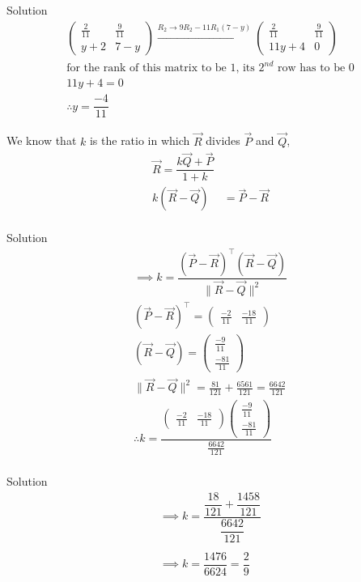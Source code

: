 \documentclass{beamer}
\providecommand{\brak}[1]{\ensuremath{\left(#1\right)}}
\theoremstyle{remark}
\providecommand{\norm}[1]{\lVert#1\rVert}
\newcommand{\myvec}[1]{\ensuremath{\begin{pmatrix}#1\end{pmatrix}}}
\begin{document}
\begin{frame}{Solution}
\begin{align*}
 \myvec{\frac{2}{11}&\frac{9}{11}\\ y+2&7-y} \overset{R_2 \rightarrow 9R_2-11 R_1\brak{7-y}}{\longrightarrow} \myvec{\frac{2}{11} &\frac{9}{11} \\ 11y+4 & 0} \\
    \text{for the rank of this matrix to be 1, its $2^{nd}$ row has to be 0}\\ 11y+4=0\\
    \therefore y=\dfrac{-4}{11}  
\end{align*}

We know that $k$ is the ratio in which $\vec{R}$ divides $\vec{P}$ and $\vec{Q}$,
\begin{align*}
    \vec{R}=\dfrac{k\vec{Q}+\vec{P}}{1+k}\\
   k\brak{\vec{R}-\vec{Q}}&= \vec{P}-\vec{R}\\
\end{align*}
\end{frame}

\begin{frame}{Solution}
   \begin{align*}
    \implies k =\dfrac{\brak{\vec{P}-\vec{R}}^{\top}\brak{\vec{R}-\vec{Q}}}{\norm{\vec{R}-\vec{Q}}^2}\\
   \brak{\vec{P}-\vec{R}}^{\top}=\myvec{\frac{-2}{11} & \frac{-18}{11}}\\
   \brak{\vec{R}-\vec{Q}}=\myvec{\frac{-9}{11} \\ \frac{-81}{11}}\\
   \norm{\vec{R}-\vec{Q}}^2=\frac{81}{121} + \frac{6561}{121}=\frac{6642}{121}\\
   \therefore k=\dfrac{\myvec{\frac{-2}{11} & \frac{-18}{11}}\myvec{\frac{-9}{11} \\ \frac{-81}{11}}}{\frac{6642}{121}}\\
   \end{align*}


\end{frame}
\begin{frame}{Solution}
    \begin{align*}
        \implies k=\dfrac{\dfrac{18}{121} + \dfrac{1458}{121}}{\dfrac{6642}{121}}\\ \\ 
   \implies k=\dfrac{1476}{6624}=\dfrac{2}{9}
    \end{align*}
\end{frame}
\end{document}
